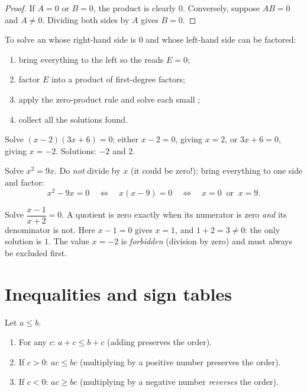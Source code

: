 \begin{proof}
If $A = 0$ or $B = 0$, the product is clearly $0$. Conversely, suppose
$AB = 0$ and $A \neq 0$. Dividing both sides by $A$ gives $B = 0$.
\end{proof}

\begin{method}\label{met:g10:algebra:zeroproduct}
To solve an  whose right-hand side is $0$ and whose left-hand
side can be factored:
\begin{enumerate}
  \item bring everything to the left so the  reads $E = 0$;
  \item factor $E$ into a product of first-degree factors;
  \item apply the zero-product rule and solve each small ;
  \item collect all the solutions found.
\end{enumerate}
\end{method}

\begin{example}\label{ex:g10:algebra:zeroproduct}
Solve $(x - 2)(3x + 6) = 0$: either $x - 2 = 0$, giving $x = 2$, or
$3x + 6 = 0$, giving $x = -2$. Solutions: $-2$ and $2$.

Solve $x^2 = 9x$. Do \emph{not} divide by $x$ (it could be zero!); bring
everything to one side and factor:
\[
x^2 - 9x = 0
\quad\Longleftrightarrow\quad
x(x - 9) = 0
\quad\Longleftrightarrow\quad
x = 0 \ \text{ or } \ x = 9 .
\]
\end{example}

\begin{example}\label{ex:g10:algebra:quotient}
Solve $\dfrac{x - 1}{x + 2} = 0$. A quotient is zero exactly when its
numerator is zero \emph{and} its denominator is not. Here $x - 1 = 0$
gives $x = 1$, and $1 + 2 = 3 \neq 0$: the only solution is $1$. The value
$x = -2$ is \emph{forbidden} (division by zero) and must always be
excluded first.
\end{example}

\section{Inequalities and sign tables}

\begin{proposition}\label{prop:g10:algebra:ineqrules}
Let $a \leq b$.
\begin{enumerate}
  \item For any $c$: $a + c \leq b + c$ (adding preserves the order).
  \item If $c > 0$: $ac \leq bc$ (multiplying by a positive number
        preserves the order).
  \item If $c < 0$: $ac \geq bc$ (multiplying by a negative number
        \emph{reverses} the order).
\end{enumerate}
\end{proposition}

